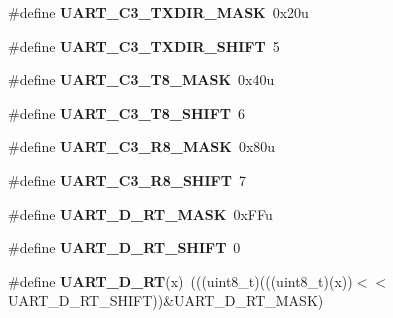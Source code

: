 \begin{DoxyCompactItemize}
\item 
\#define {\bfseries U\+A\+R\+T\+\_\+\+C3\+\_\+\+T\+X\+D\+I\+R\+\_\+\+M\+A\+SK}~0x20u\hypertarget{group__UART__Register__Masks_gae9909f5ed584e6647deec86775f025e7}{}\label{group__UART__Register__Masks_gae9909f5ed584e6647deec86775f025e7}

\item 
\#define {\bfseries U\+A\+R\+T\+\_\+\+C3\+\_\+\+T\+X\+D\+I\+R\+\_\+\+S\+H\+I\+FT}~5\hypertarget{group__UART__Register__Masks_gafd8df440afc872879f09780112122e6a}{}\label{group__UART__Register__Masks_gafd8df440afc872879f09780112122e6a}

\item 
\#define {\bfseries U\+A\+R\+T\+\_\+\+C3\+\_\+\+T8\+\_\+\+M\+A\+SK}~0x40u\hypertarget{group__UART__Register__Masks_gaec915ed2882cf21feb385399e44b5a9b}{}\label{group__UART__Register__Masks_gaec915ed2882cf21feb385399e44b5a9b}

\item 
\#define {\bfseries U\+A\+R\+T\+\_\+\+C3\+\_\+\+T8\+\_\+\+S\+H\+I\+FT}~6\hypertarget{group__UART__Register__Masks_ga98e310521d3edf56770be85701a65142}{}\label{group__UART__Register__Masks_ga98e310521d3edf56770be85701a65142}

\item 
\#define {\bfseries U\+A\+R\+T\+\_\+\+C3\+\_\+\+R8\+\_\+\+M\+A\+SK}~0x80u\hypertarget{group__UART__Register__Masks_gae17bda6e18ad786d2cedf0105976d9dc}{}\label{group__UART__Register__Masks_gae17bda6e18ad786d2cedf0105976d9dc}

\item 
\#define {\bfseries U\+A\+R\+T\+\_\+\+C3\+\_\+\+R8\+\_\+\+S\+H\+I\+FT}~7\hypertarget{group__UART__Register__Masks_gab1799b4eb595a66cc5995e206e001f78}{}\label{group__UART__Register__Masks_gab1799b4eb595a66cc5995e206e001f78}

\item 
\#define {\bfseries U\+A\+R\+T\+\_\+\+D\+\_\+\+R\+T\+\_\+\+M\+A\+SK}~0x\+F\+Fu\hypertarget{group__UART__Register__Masks_gabb8507803e62ff2f8cc3a3c7f9fc43c2}{}\label{group__UART__Register__Masks_gabb8507803e62ff2f8cc3a3c7f9fc43c2}

\item 
\#define {\bfseries U\+A\+R\+T\+\_\+\+D\+\_\+\+R\+T\+\_\+\+S\+H\+I\+FT}~0\hypertarget{group__UART__Register__Masks_ga045cb82177942d68eb711a61ee412768}{}\label{group__UART__Register__Masks_ga045cb82177942d68eb711a61ee412768}

\item 
\#define {\bfseries U\+A\+R\+T\+\_\+\+D\+\_\+\+RT}(x)~(((uint8\+\_\+t)(((uint8\+\_\+t)(x))$<$$<$U\+A\+R\+T\+\_\+\+D\+\_\+\+R\+T\+\_\+\+S\+H\+I\+FT))\&U\+A\+R\+T\+\_\+\+D\+\_\+\+R\+T\+\_\+\+M\+A\+SK)\hypertarget{group__UART__Register__Masks_ga39c00eb3f36315de588767113f3133cd}{}\label{group__UART__Register__Masks_ga39c00eb3f36315de588767113f3133cd}


\end{DoxyCompactItemize}
